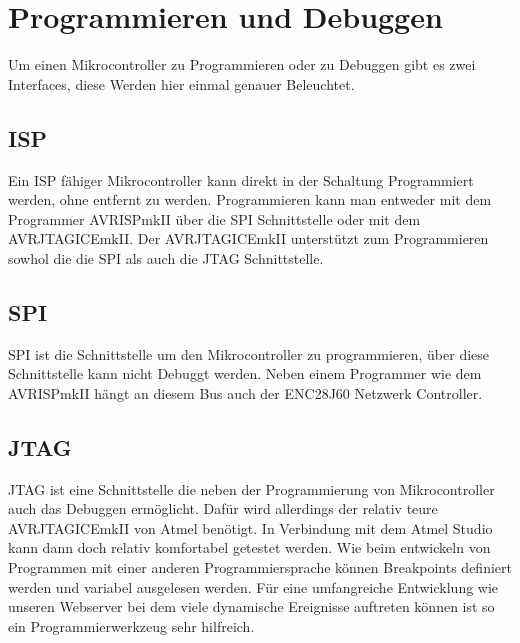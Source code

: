 \chapter{Programmieren und Debuggen}

Um einen Mikrocontroller zu Programmieren oder zu Debuggen gibt es zwei
Interfaces, diese Werden hier einmal genauer Beleuchtet.

\section{ISP}

Ein \ac{ISP} fähiger Mikrocontroller kann direkt in der Schaltung Programmiert
werden, ohne entfernt zu werden. Programmieren kann man entweder mit dem
Programmer AVRISPmkII über die \acs{SPI} Schnittstelle oder mit dem  
AVRJTAGICEmkII. Der AVRJTAGICEmkII unterstützt zum Programmieren sowhol die
die \acs{SPI} als auch die \acs{JTAG} Schnittstelle.

\section{SPI}

\acf{SPI} ist die Schnittstelle um den Mikrocontroller zu programmieren, über
diese Schnittstelle kann nicht Debuggt werden. Neben einem Programmer wie dem
AVRISPmkII hängt an diesem Bus auch der ENC28J60 Netzwerk Controller.

\section{JTAG}

\acf{JTAG} ist eine Schnittstelle die neben der Programmierung von
Mikrocontroller auch das Debuggen ermöglicht.
Dafür wird allerdings der relativ teure AVRJTAGICEmkII von Atmel benötigt.
In Verbindung mit dem Atmel Studio kann dann doch relativ komfortabel getestet
werden. Wie beim entwickeln von Programmen mit einer anderen Programmiersprache
können Breakpoints definiert werden und variabel ausgelesen werden. Für eine
umfangreiche Entwicklung wie unseren Webserver bei dem viele dynamische
Ereignisse auftreten können ist so ein Programmierwerkzeug sehr hilfreich.
